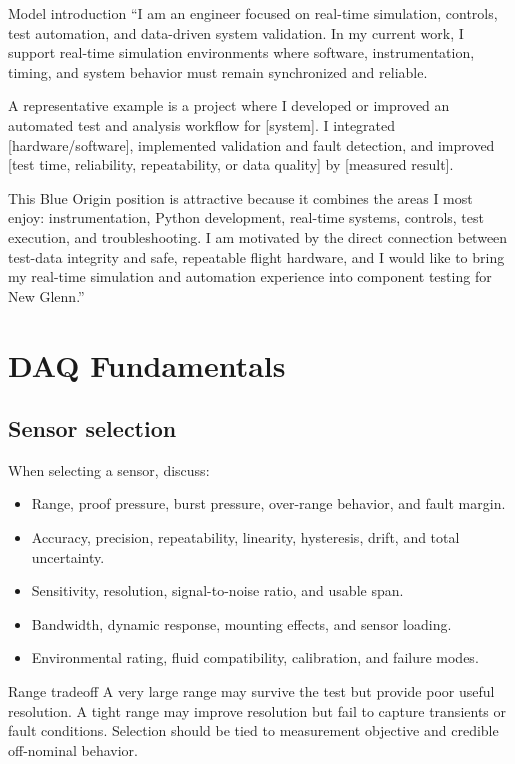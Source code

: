 \documentclass[11pt]{article}
\begin{document}
\begin{answerbox}{Model introduction}
``I am an engineer focused on real-time simulation, controls, test automation,
and data-driven system validation. In my current work, I support real-time
simulation environments where software, instrumentation, timing, and system
behavior must remain synchronized and reliable.

A representative example is a project where I developed or improved an
automated test and analysis workflow for [system]. I integrated
[hardware/software], implemented validation and fault detection, and improved
[test time, reliability, repeatability, or data quality] by [measured result].

This Blue Origin position is attractive because it combines the areas I most
enjoy: instrumentation, Python development, real-time systems, controls, test
execution, and troubleshooting. I am motivated by the direct connection between
test-data integrity and safe, repeatable flight hardware, and I would like to
bring my real-time simulation and automation experience into component testing
for New Glenn.''
\end{answerbox}

\section{DAQ Fundamentals}

\subsection{Sensor selection}
When selecting a sensor, discuss:
\begin{itemize}
  \item Range, proof pressure, burst pressure, over-range behavior, and fault margin.
  \item Accuracy, precision, repeatability, linearity, hysteresis, drift, and total uncertainty.
  \item Sensitivity, resolution, signal-to-noise ratio, and usable span.
  \item Bandwidth, dynamic response, mounting effects, and sensor loading.
  \item Environmental rating, fluid compatibility, calibration, and failure modes.
\end{itemize}

\begin{warningbox}{Range tradeoff}
A very large range may survive the test but provide poor useful resolution.
A tight range may improve resolution but fail to capture transients or fault
conditions. Selection should be tied to measurement objective and credible
off-nominal behavior.
\end{warningbox}
\end{document}
